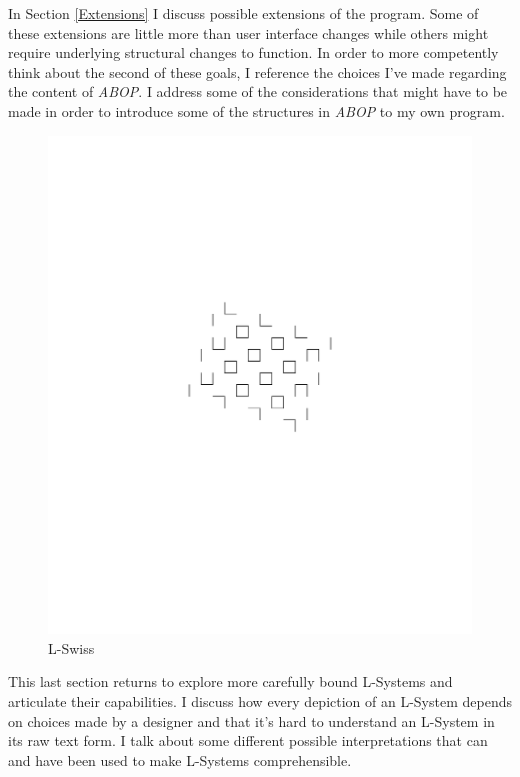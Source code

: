 \documentclass[12pt,twoside]{reedthesis}
\begin{document}
	In Section \ref{Extensions} I discuss possible extensions of the program. Some of these extensions are little more than user interface changes while others might require underlying structural changes to function. In order to more competently think about the second of these goals, I reference the choices I've made regarding the content of \textit{ABOP}. I address some of the considerations that might have to be made in order to introduce some of the structures in \textit{ABOP} to my own program.
	
	\begin{figure}[h]
	\centering
	\includegraphics[clip=true, viewport=1in 4.5in 9in 8in, scale=0.5]{Images/ThePathWeWillFollow3} %
	\caption[L-Swiss]{L-Swiss\footnotemark}
	\label {Holey}
	\end{figure}
		
	This last section returns to explore more carefully bound L-Systems and articulate their capabilities. I discuss how every depiction of an L-System depends on choices made by a designer and that it's hard to understand an L-System in its raw text form. I talk about some different possible interpretations that can and have been used to make L-Systems comprehensible. 
	
\end{document}
